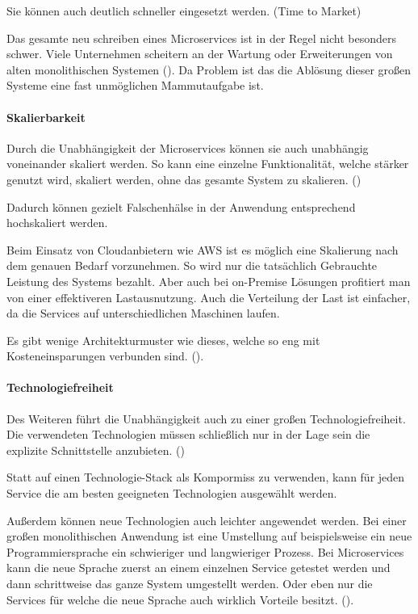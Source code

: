 Sie können auch deutlich schneller eingesetzt werden. (Time to Market)

Das gesamte neu schreiben eines Microservices ist in der Regel nicht besonders schwer. Viele Unternehmen scheitern an der Wartung oder Erweiterungen von alten monolithischen Systemen (\cite[S. 29]{newmanMicroservices2015}). Da Problem ist das die Ablösung dieser großen Systeme eine fast unmöglichen Mammutaufgabe ist.

\paragraph{Skalierbarkeit}
Durch die Unabhängigkeit der Microservices können sie auch unabhängig voneinander skaliert werden. So kann eine einzelne Funktionalität, welche stärker genutzt wird, skaliert werden, ohne das gesamte System zu skalieren. (\cite[S. 5]{wolffMicroservices2018})

Dadurch können gezielt Falschenhälse in der Anwendung entsprechend hochskaliert werden.

Beim Einsatz von Cloudanbietern wie AWS ist es möglich eine Skalierung nach dem genauen Bedarf vorzunehmen. So wird nur die tatsächlich Gebrauchte Leistung des Systems bezahlt. Aber auch bei on-Premise Lösungen profitiert man von einer effektiveren Lastausnutzung. Auch die Verteilung der Last ist einfacher, da die Services auf unterschiedlichen Maschinen laufen. 

Es gibt wenige Architekturmuster wie dieses, welche so eng mit Kosteneinsparungen verbunden sind. (\cite[S. 27]{newmanMicroservices2015}).

\paragraph{Technologiefreiheit}

Des Weiteren führt die Unabhängigkeit auch zu einer großen Technologiefreiheit. Die verwendeten Technologien müssen schließlich nur in der Lage sein die explizite Schnittstelle anzubieten. (\cite[S. 5]{wolffMicroservices2018})

Statt auf einen Technologie-Stack als Kompormiss zu verwenden, kann für jeden Service die am besten geeigneten Technologien ausgewählt werden. 

Außerdem können neue Technologien auch leichter angewendet werden. Bei einer großen monolithischen Anwendung ist eine Umstellung auf beispielsweise ein neue Programmiersprache ein schwieriger und langwieriger Prozess. Bei Microservices kann die neue Sprache zuerst an einem einzelnen Service getestet werden und dann schrittweise das ganze System umgestellt werden. Oder eben nur die Services für welche die neue Sprache auch wirklich Vorteile besitzt. (\cite[S. 25]{newmanMicroservices2015}).

